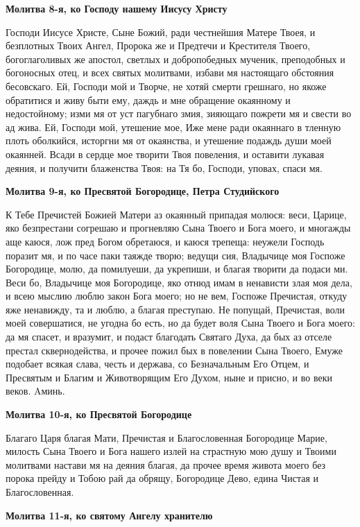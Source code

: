 \medskip
\bfseries Молитва 8-я, ко Господу нашему Иисусу Христу\normalfont{}\nopagebreak


Господи Иисусе Христе, Сыне Божий, ради честнейшия Матере Твоея, и безплотных Твоих Ангел, Пророка же и Предтечи и Крестителя Твоего, богоглаголивых же апостол, светлых и добропобедных мученик, преподобных и богоносных отец, и всех святых молитвами, избави мя настоящаго обстояния бесовскаго. Ей, Господи мой и Творче, не хотяй смерти грешнаго, но якоже обратитися и живу быти ему, даждь и мне обращение окаянному и недостойному; изми мя от уст пагубнаго змия, зияющаго пожрети мя и свести во ад жива. Ей, Господи мой, утешение мое, Иже мене ради окаяннаго в тленную плоть оболкийся, исторгни мя от окаянства, и утешение подаждь души моей окаянней. Всади в сердце мое творити Твоя повеления, и оставити лукавая деяния, и получити блаженства Твоя: на Тя бо, Господи, уповах, спаси мя.


\medskip
\bfseries Молитва 9-я, ко Пресвятой Богородице, Петра Студийского\normalfont{}\nopagebreak


К Тебе Пречистей Божией Матери аз окаянный припадая молюся: веси, Царице, яко безпрестани согрешаю и прогневляю Сына Твоего и Бога моего, и многажды аще каюся, лож пред Богом обретаюся, и каюся трепеща: неужели Господь поразит мя, и по часе паки таяжде творю; ведущи сия, Владычице моя Госпоже Богородице, молю, да помилуеши, да укрепиши, и благая творити да подаси ми. Веси бо, Владычице моя Богородице, яко отнюд имам в ненависти злая моя дела, и всею мыслию люблю закон Бога моего; но не вем, Госпоже Пречистая, откуду яже ненавижду, та и люблю, а благая преступаю. Не попущай, Пречистая, воли моей совершатися, не угодна бо есть, но да будет воля Сына Твоего и Бога моего: да мя спасет, и вразумит, и подаст благодать Святаго Духа, да бых аз отселе престал сквернодейства, и прочее пожил бых в повелении Сына Твоего, Емуже подобает всякая слава, честь и держава, со Безначальным Его Отцем, и Пресвятым и Благим и Животворящим Его Духом, ныне и присно, и во веки веков. Aминь.


\medskip
\bfseries Молитва 10-я, ко Пресвятой Богородиц\normalfont{}е


Благаго Царя благая Мати, Пречистая и Благословенная Богородице Марие, милость Сына Твоего и Бога нашего излей на страстную мою душу и Твоими молитвами настави мя на деяния благая, да прочее время живота моего без порока прейду и Тобою рай да обрящу, Богородице Дево, едина Чистая и Благословенная.


\medskip
\bfseries Молитва 11-я, ко святому Ангелу хранителю\normalfont{}\nopagebreak


